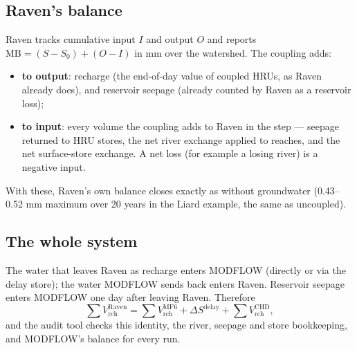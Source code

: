 \subsection{Raven's balance}
Raven tracks cumulative input $I$ and output $O$ and reports $\mathrm{MB}=\left(S-S_0\right)+\left(O-I\right)$ in mm over
the watershed. The coupling adds:
\begin{itemize}
\item \textbf{to output}: recharge (the end-of-day  value of coupled HRUs, as Raven already does), and
reservoir seepage (already counted by Raven as a reservoir loss);
\item \textbf{to input}: every volume the coupling adds to Raven in the step --- seepage returned to HRU stores, the net
river exchange applied to reaches, and the net surface-store exchange. A net loss (for example a losing river) is a
negative input.
\end{itemize}
With these, Raven's own balance closes exactly as without groundwater (0.43--0.52 mm maximum over 20 years in the Liard
example, the same as uncoupled).

\subsection{The whole system}
The water that leaves Raven as recharge enters MODFLOW (directly or via the delay store); the water MODFLOW sends back
enters Raven. Reservoir seepage enters MODFLOW one day after leaving Raven. Therefore
\begin{equation}
\sum V^{\mathrm{Raven}}_{\mathrm{rch}}=\sum V^{\mathrm{MF6}}_{\mathrm{rch}}+\Delta S^{\mathrm{delay}}+\sum V^{\mathrm{CHD}}_{\mathrm{rch}},
\end{equation}
and the audit tool checks this identity, the river, seepage and store bookkeeping, and MODFLOW's balance for every run.

